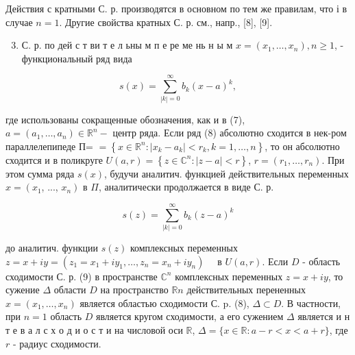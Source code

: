 \documentclass[10pt]{article}
\begin{document}
Действия с кратными С. р. производятся в основном по тем же правилам, что і в случае $n=1$. Другие свойства кратных С. р. см., напр., [8], [9].



\begin{enumerate}

  \setcounter{enumi}{2}

  \item С. р. по дей с т ви т е л ьны м п е ре ме нь н ы м $x=\left(x_{1}, \ldots, x_{n}\right), n \geqslant 1$, - функциональный ряд вида

\end{enumerate}



\[

s(x)=\sum_{|k|=0}^{\infty} b_{k}(x-a)^{k},

\]



где использованы сокращенные обозначения, как и в (7), $a=\left(a_{1}, \ldots, a_{n}\right) \in \mathbb{R}^{n}-$ центр ряда. Если ряд (8) абсолютно сходится в нек-ром параллелепипеде П= $=\left\{x \in \mathbb{R}^{n}:\left|x_{k}-a_{k}\right|<r_{k}, k=1, \ldots, n\right\}$, то он абсолютно сходится и в поликруге $U(a, r)=\left\{z \in \mathbb{C}^{n}:|z-a|<r\right\}$, $r=\left(r_{1}, \ldots, r_{n}\right)$. При этом сумма ряда $s(x)$, будучи аналитич. функцией действительных переменных $x=\left(x_{1}\right.$, ..., $\left.x_{n}\right)$ в $\Pi$, аналитически продолжается в виде С. р.



\[

s(z)=\sum_{|k|=0}^{\infty} b_{k}(z-a)^{k}

\]



до аналитич. функции $s(z)$ комплексных переменных $z=x+i y=\left(z_{1}=x_{1}+i y_{1}, \ldots, z_{n}=x_{n}+i y_{n}\right) \quad$ в $U(a, r)$. Если $D$ - область сходимости С. р. (9) в пространстве $\mathbb{C}^{n}$ комплексных переменных $z=x+i y$, то сужение $\Delta$ области $D$ на пространство $\mathbb{R} n$ действительных перененных $x=\left(x_{1}, \ldots, x_{n}\right)$ является областью сходимости С. p. (8), $\Delta \subset D$. В частности, при $n=1$ область $D$ является кругом сходимости, а его сужением $\Delta$ является и н т е в а л с х о д и о с т и на числовой оси $\mathbb{R}$, $\Delta=\{x \in \mathbb{R}: a-r<x<a+r\}$, где $r$ - радиус сходимости.
\end{document}
